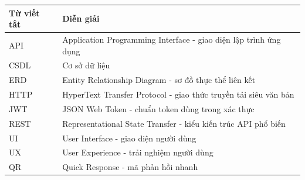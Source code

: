 \documentclass[../main.tex]{subfiles}
\begin{document}
\begin{longtable}{|p{3cm}|p{10cm}|}
\hline
\textbf{Từ viết tắt} & \textbf{Diễn giải} \\
\hline
API & Application Programming Interface - giao diện lập trình ứng dụng \\
\hline
CSDL & Cơ sở dữ liệu \\
\hline
ERD & Entity Relationship Diagram - sơ đồ thực thể liên kết \\
\hline
HTTP & HyperText Transfer Protocol - giao thức truyền tải siêu văn bản \\
\hline
JWT & JSON Web Token - chuẩn token dùng trong xác thực \\
\hline
REST & Representational State Transfer - kiểu kiến trúc API phổ biến \\
\hline
UI & User Interface - giao diện người dùng \\
\hline
UX & User Experience - trải nghiệm người dùng \\
\hline
QR & Quick Response - mã phản hồi nhanh \\
\hline
\end{longtable}
\end{document}
